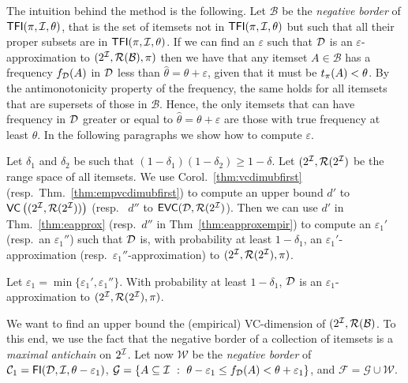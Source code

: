 The intuition behind the method is the following. 
Let $\mathcal{B}$ be
the \emph{negative border} of $\mathsf{TFI}(\pi,{\cal I},\theta)$, that is the set of itemsets
not in $\mathsf{TFI}(\pi,{\cal I},\theta)$ but such that all their proper subsets are in
$\mathsf{TFI}(\pi,{\cal I},\theta)$. If we can find an $\varepsilon$ such that ${\cal D}$ is an
$\varepsilon$-approximation to $(2^{\cal I},\mathcal{R}(\mathcal{B}),\pi)$ then %
we have that any itemset
$A\in\mathcal{B}$ has a frequency $f_{\cal D}(A)$ in ${\cal D}$ less than
$\hat{\theta}=\theta+\varepsilon$, given that it must be $t_\pi(A)<\theta$. By the
antimonotonicity property of the frequency, the same holds for all itemsets that
are supersets of those in $\mathcal{B}$. Hence, the only itemsets that can have
frequency in ${\cal D}$ greater or equal to $\hat{\theta}=\theta+\varepsilon$ are
those with true frequency at least $\theta$. In the following paragraphs we show
how to compute $\varepsilon$.

Let $\delta_1$ and $\delta_2$ be such that $(1-\delta_1)(1-\delta_2)\ge
1-\delta$. Let $(2^{\cal I},\mathcal{R}(2^{\cal I})$ be the range space of all itemsets.
We use Corol.~\ref{thm:vcdimubfirst} (resp.~Thm.~\ref{thm:empvcdimubfirst}) to
compute an upper bound $d'$ to $\mathsf{VC}\left((2^{\cal I},\mathcal{R}(2^{\cal I}))\right)$ (resp.~ $d''$ to
$\mathsf{EVC}({\cal D},\mathcal{R}(2^{\cal I})$). Then we can use $d'$ in Thm.~\ref{thm:eapprox} (resp.~$d''$ in
Thm~\ref{thm:eapproxempir}) to compute an $\varepsilon_1'$ (resp.~an
$\varepsilon_1''$) such that ${\cal D}$ is, with probability at
least $1-\delta_1$, an $\varepsilon_1'$-approximation
(resp.~$\varepsilon_1''$-approximation) to $(2^{\cal I},\mathcal{R}(2^{\cal I}),\pi)$.
\begin{fact}
Let
$\varepsilon_1=\min\{\varepsilon_1',\varepsilon_1''\}$. %
With probability at least $1-\delta_1$, ${\cal D}$ is an
$\varepsilon_1$-approximation to $(2^{\cal I},\mathcal{R}(2^{\cal I}),\pi)$.
\end{fact}

We want to find an upper bound the (empirical) VC-dimension of
$(2^{\cal I},\mathcal{R}(\mathcal{B})$. To this end, we use the fact that the negative border of a
collection of itemsets is a \emph{maximal
antichain} on $2^{\cal I}$. %
Let now $\mathcal{W}$ be the \emph{negative
border} of $\mathcal{C}_1=\mathsf{FI}({\cal D},{\cal I},\theta-\varepsilon_1)$, 
$\mathcal{G}=\{A\subseteq{\cal I} ~:~ \theta-\varepsilon_1\le
f_{\cal D}(A)<\theta+\varepsilon_1\}$, and $\mathcal{F}=\mathcal{G}\cup\mathcal{W}$.


